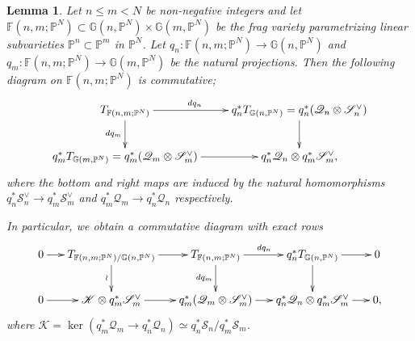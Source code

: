 \documentclass[a4paper,12pt]{amsart}
\theoremstyle{plain}
\newtheorem{lem}[lem]{Lemma}
\theoremstyle{definition}
\begin{document}
\begin{lem}\label{lem_comm_diagram}
  Let $n {\leqslant} m < N$ be non-negative integers
  and let $\mathbb{F}(n,m ;{\mathbb{P}}^N) \subset {\mathbb{G}}(n, {{\mathbb{P}}^N}) \times {\mathbb{G}}(m, {{\mathbb{P}}^N})$ be the frag variety
  parametrizing linear subvarieties
  ${\mathbb{P}}^{n} \subset {\mathbb{P}}^{m}$ in ${{\mathbb{P}}^N}$.
  Let $q_n : \mathbb{F}(n,m ;{\mathbb{P}}^N) {\rightarrow} {\mathbb {G}}(n,{\mathbb{P}}^N)$ and
  $q_m : \mathbb{F}(n,m ;{\mathbb{P}}^N) {\rightarrow} {\mathbb {G}}(m,{\mathbb{P}}^N)$
  be the natural projections.
  Then the following diagram on $\mathbb{F}(n,m ;{\mathbb{P}}^N)$ is commutative;
  \begin{equation}\label{eq:flag-comm}
  \begin{aligned}
    \xymatrix{
      T_{\mathbb{F}(n,m ;{\mathbb{P}}^N)}   \ar[d]_(.5){d q_m} \ar[r]^(.4){d q_n}
      &    q_n^* T_{{\mathbb {G}}(n,{\mathbb{P}}^N)} =  q_n^* ({\mathscr{Q}}_{n} \otimes  {\mathscr{S}}_{n}\spcheck)  \ar[d]
      \\
      q_m^* T_{{\mathbb {G}}(m,{\mathbb{P}}^N)} =  q_m^* ({\mathscr{Q}}_{m} \otimes  {\mathscr{S}}_{m}\spcheck)\ar[r]
      & q_n^* {\mathscr{Q}}_{n} \otimes   q_m^*  {\mathscr{S}}_{m}\spcheck ,
    }
    \end{aligned}
  \end{equation}
  where the bottom and right maps are induced by the natural homomorphisms $q_n^* {\mathscr{S}}_{n}^{\vee} {\rightarrow} q_m^* {\mathscr{S}}_{m}^{\vee} $
  and $q_m^* {\mathscr{Q}}_{m} {\rightarrow} q_n^* {\mathscr{Q}}_{n}$ respectively.
  
  In particular,
  we obtain a commutative diagram with exact rows
  \begin{equation}\label{diag_lem_comm}
    \begin{aligned}
      \xymatrix@C=15pt{
        0 \ar[r] & T_{\mathbb{F}(n,m ;{\mathbb{P}}^N) / {\mathbb {G}}(n,{\mathbb{P}}^N)}     \ar[r] \ar[d]_{\wr}& T_{\mathbb{F}(n,m ;{\mathbb{P}}^N)}   \ar[d]_{dq_m}\ar[r]^{dq_n}
        &    q_n^* T_{{\mathbb {G}}(n,{\mathbb{P}}^N)}  \ar[d] \ar[r]& 0
        \\
        0 \ar[r] & \mathscr{K} \otimes q_m^* {\mathscr{S}}_{m}\spcheck \ar[r]&    q_m^* ({\mathscr{Q}}_{m} \otimes  {\mathscr{S}}_{m}\spcheck)\ar[r]
        & q_n^* {\mathscr{Q}}_{n} \otimes   q_m^*  {\mathscr{S}}_{m}\spcheck \ar[r] & 0,
      } 
    \end{aligned}
  \end{equation}
  where $\mathscr{K} = \ker   (  q_m^*  {\mathscr{Q}}_{m} \rightarrow q_n^* {\mathscr{Q}}_{n} ) \simeq q_n^* {\mathscr{S}}_{n} / q_m^* {\mathscr{S}}_{m}$.
\end{lem}
\end{document}
